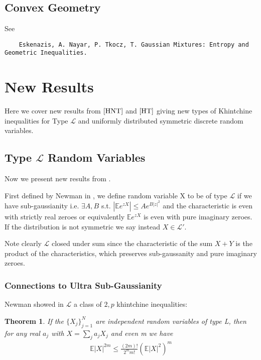 \documentclass[10pt]{article}
\newcommand{\E}{\mathbb{E}}
\newcommand{\1}{\textbf{1}}
\newtheorem{theorem}{Theorem}
\theoremstyle{remark}
\theoremstyle{definition}
\begin{document}
\subsection{Convex Geometry}

See

\begin{verbatim}
	Eskenazis, A. Nayar, P. Tkocz, T. Gaussian Mixtures: Entropy and Geometric Inequalities.
\end{verbatim}

\section{New Results}

Here we cover new results from $\cite{HNT}$ and $\cite{HT}$ giving new types of Khintchine inequalities for Type $\mathcal{L}$ and uniformly distributed symmetric discrete random variables.

\subsection{Type $\mathcal{L}$ Random Variables}

Now we present new results from \cite{HNT}. 

First defined by Newman in \cite{N}, we define random variable X to be of type $\mathcal{L}$ if we have sub-gaussianity i.e. $\exists A,B$ s.t. $|\E e^{z X}| \leq A e^{B|z|^2}$ and the characteristic is even with strictly real zeroes or equivalently $\E e^{zX}$ is even with pure imaginary zeroes. If the distribution is not symmetric we say instead $X \in \mathcal{L}'$. 

Note clearly $\mathcal{L}$ closed under sum since the characteristic of the sum $X+Y$ is the product of the characteristics, which preserves sub-gaussanity and pure imaginary zeroes. 

\subsubsection{Connections to Ultra Sub-Gaussianity}

Newman showed in \cite{N} $\mathcal{L}$ a class of $2,p$ khintchine inequalities:

\begin{theorem}
	If the $\{X_j\}_{j=1}^N$ are independent random variables of type L, then for any real $a_j$ with $X= \sum_j a_j X_j$ and even m we have
	\begin{align*}
		\E|X|^{2m} \leq \frac{(2m)!}{2^mm!}(\E|X|^2)^m
	\end{align*}
\end{theorem}
\end{document}
